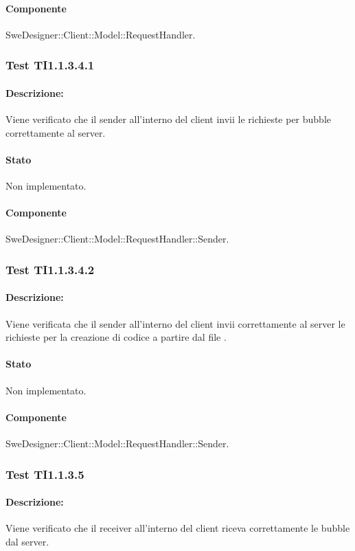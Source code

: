 \documentclass[../PianoDiQualifica.tex]{subfiles}
\begin{document}
	\paragraph{Componente} SweDesigner::Client::Model::RequestHandler.
	\subsubsection{Test TI1.1.3.4.1}
	\paragraph{Descrizione:} Viene verificato che il sender all'interno del client invii le richieste per bubble correttamente al server.
	\paragraph{Stato} Non implementato.
	\paragraph{Componente} SweDesigner::Client::Model::RequestHandler::Sender.
	
	\subsubsection{Test TI1.1.3.4.2}
	\paragraph{Descrizione:} Viene verificata che il sender all'interno del client invii  correttamente al server le richieste per la creazione di codice a partire dal file .
	\paragraph{Stato} Non implementato.
	\paragraph{Componente} SweDesigner::Client::Model::RequestHandler::Sender.
	
	\subsubsection{Test TI1.1.3.5}
	\paragraph{Descrizione:} Viene verificato che il receiver all'interno del client riceva correttamente le bubble dal server.
\end{document}
